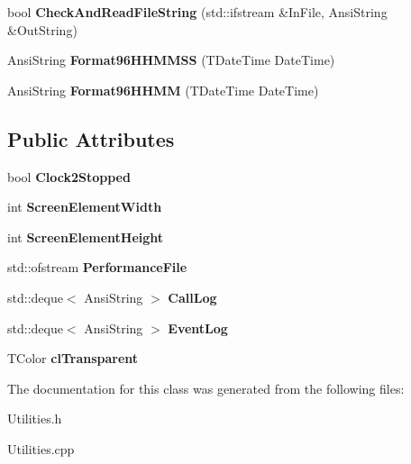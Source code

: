 \begin{DoxyCompactItemize}
\item 
\mbox{\label{class_t_utilities_a0a0ef5bf2fc74c0026f2a8bec4151d37}} 
bool {\bfseries Check\+And\+Read\+File\+String} (std\+::ifstream \&In\+File, Ansi\+String \&Out\+String)
\item 
\mbox{\label{class_t_utilities_a2dfbe3d4ed11770bc1a902b51afdc10c}} 
Ansi\+String {\bfseries Format96\+H\+H\+M\+M\+SS} (T\+Date\+Time Date\+Time)
\item 
\mbox{\label{class_t_utilities_a6dc0e83b149563fdf43f068fd26cead8}} 
Ansi\+String {\bfseries Format96\+H\+H\+MM} (T\+Date\+Time Date\+Time)
\end{DoxyCompactItemize}
\subsection*{Public Attributes}
\begin{DoxyCompactItemize}
\item 
\mbox{\label{class_t_utilities_a0fd0d8e0ec95309b508fd37fa541555e}} 
bool {\bfseries Clock2\+Stopped}
\item 
\mbox{\label{class_t_utilities_ac9422864dc36c3d98ad952f10026c572}} 
int {\bfseries Screen\+Element\+Width}
\item 
\mbox{\label{class_t_utilities_a45d9703729a28c2fb2638539fa909e81}} 
int {\bfseries Screen\+Element\+Height}
\item 
\mbox{\label{class_t_utilities_acc7cd1d066ac7942ad6c1239b3c25eee}} 
std\+::ofstream {\bfseries Performance\+File}
\item 
\mbox{\label{class_t_utilities_abf6c3e70d5fbf58720ff0d9f80de5bde}} 
std\+::deque$<$ Ansi\+String $>$ {\bfseries Call\+Log}
\item 
\mbox{\label{class_t_utilities_ace6be5cece5f2e271c0b85a9d2f51917}} 
std\+::deque$<$ Ansi\+String $>$ {\bfseries Event\+Log}
\item 
\mbox{\label{class_t_utilities_a89b8716bbc78332d40427ed688ce56bd}} 
T\+Color {\bfseries cl\+Transparent}
\end{DoxyCompactItemize}


The documentation for this class was generated from the following files\+:\begin{DoxyCompactItemize}
\item 
Utilities.\+h\item 
Utilities.\+cpp\end{DoxyCompactItemize}
